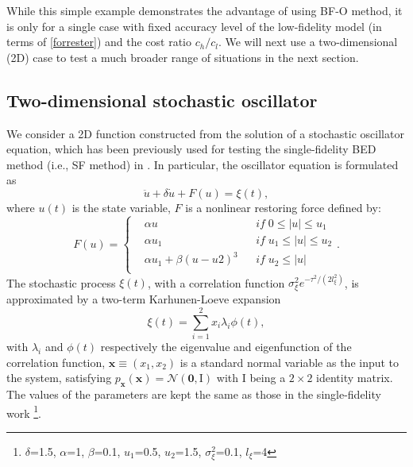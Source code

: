 \documentclass[11pt]{article}
\begin{document}
While this simple example demonstrates the advantage of using BF-O method, it is only for a single case with fixed accuracy level of the low-fidelity model (in terms of \eqref{forrester}) and the cost ratio $c_h/c_l$. We will next use a two-dimensional (2D) case to test a much broader range of situations in the next section.


\subsection{Two-dimensional stochastic oscillator}
We consider a 2D function constructed from the solution of a stochastic oscillator equation, which has been previously used for testing the single-fidelity BED method (i.e., SF method) in  \cite{mohamad2018sequential, blanchard2021output}. In particular, the oscillator equation is formulated as
\begin{equation}
    \ddot{u} + \delta \dot{u} + F(u) = \xi(t),
\end{equation}
where $u(t)$ is the state variable, $F$ is a nonlinear restoring force defined by:
$$
F(u) = \left\{
\begin{aligned}
    & \alpha u           &
    &  if \; 0 \leq |u| \leq u_1 \\
    & \alpha u_1         &
    &  if \; u_1 \leq |u| \leq u_2  \\
    & \alpha u_1 + \beta(u-u2)^3 &
    &  if \; u_2 \leq|u|           \\
\end{aligned}
\right..
$$
The stochastic process $\xi(t)$, with a correlation function $\sigma_{\xi}^2 e^{-\tau^2/(2 l_{\xi}^2)}$, is approximated by a two-term Karhunen-Loeve expansion
\begin{equation}
    \xi(t) = \sum_{i=1}^{2} x_i \lambda_i \phi(t),
\end{equation}
with $\lambda_i$ and $\phi(t)$ respectively the eigenvalue and eigenfunction of the correlation function, $\mathbf{x}\equiv (x_1, x_2)$ is a standard normal variable as the input to the system, satisfying $p_{\mathbf{x}}(\mathbf{x}) = \mathcal{N}(\mathbf{0}, \mathrm{I})$ with $\mathrm{I}$ being a $2 \times 2$ identity matrix. The values of the parameters are kept the same as those in the single-fidelity work \cite{blanchard2021output} \footnote[1]{$\delta$=1.5, $\alpha$=1, $\beta$=0.1, $u_1$=0.5, $u_2$=1.5, $\sigma_{\xi}^2$=0.1, $l_\xi$=4}.
\end{document}
